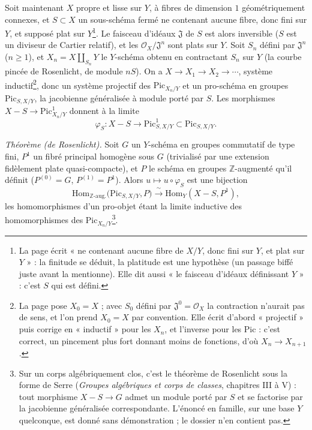 \documentclass[11pt,a4paper]{article}
\begin{document}
Soit maintenant $X$ propre et lisse sur $Y$, à fibres de dimension $1$
géométriquement connexes, et $S \subset X$ un sous-schéma fermé ne contenant
aucune fibre, donc fini sur $Y$, et supposé plat sur $Y$\footnote{La page écrit
« ne contenant aucune fibre de $X/Y$, donc fini sur $Y$, et plat sur $Y$ » : la
finitude se déduit, la platitude est une hypothèse (un passage biffé juste avant
la mentionne). Elle dit aussi « le faisceau d'idéaux définissant $Y$ » : c'est
$S$ qui est défini.}. Le faisceau d'idéaux $\mathfrak{J}$ de $S$ est alors
inversible ($S$ est un diviseur de Cartier relatif), et les
$\mathcal{O}_X/\mathfrak{J}^n$ sont plats sur $Y$. Soit $S_n$ défini par
$\mathfrak{J}^n$ ($n \geq 1$), et $X_n = X \amalg_{S_n} Y$ le $Y$-schéma obtenu en
contractant $S_n$ sur $Y$ (la courbe pincée de Rosenlicht, de module $nS$). On a
$X \to X_1 \to X_2 \to \cdots$, système inductif\footnote{La page pose $X_0 = X$ ;
avec $S_0$ défini par $\mathfrak{J}^0 = \mathcal{O}_X$ la contraction n'aurait pas
de sens, et l'on prend $X_0 = X$ par convention. Elle écrit d'abord
« projectif » puis corrige en « inductif » pour les $X_n$, et l'inverse pour les
$\mathrm{Pic}$ : c'est correct, un pincement plus fort donnant moins de fonctions,
d'où $X_n \to X_{n+1}$.}, donc un système projectif des $\mathrm{Pic}_{X_n/Y}$ et
un pro-schéma en groupes $\mathrm{Pic}_{S,X/Y}$, la jacobienne généralisée à
module porté par $S$. Les morphismes $X - S \to \mathrm{Pic}^1_{X_n/Y}$ donnent à
la limite
\[
\varphi_S : X - S \longrightarrow \mathrm{Pic}^1_{S,X/Y} \subset \mathrm{Pic}_{S,X/Y}.
\]


\emph{Théorème (de Rosenlicht).} Soit $G$ un $Y$-schéma en groupes commutatif de
type fini, $P^1$ un fibré principal homogène sous $G$ (trivialisé par une
extension fidèlement plate quasi-compacte), et $P$ le schéma en groupes
$\mathbb{Z}$-augmenté qu'il définit ($P^{(0)} = G$, $P^{(1)} = P^1$). Alors
$u \mapsto u \circ \varphi_S$ est une bijection
\[
\mathrm{Hom}_{\mathbb{Z}\text{-aug.}}\bigl(\mathrm{Pic}_{S,X/Y}, P\bigr)
\xrightarrow{\ \sim\ } \mathrm{Hom}_Y(X - S, P^1),
\]
les homomorphismes d'un pro-objet étant la limite inductive des homomorphismes
des $\mathrm{Pic}_{X_n/Y}$\footnote{Sur un corps algébriquement clos, c'est le
théorème de Rosenlicht sous la forme de Serre (\emph{Groupes algébriques et corps
de classes}, chapitres III à V) : tout morphisme $X - S \to G$ admet un module
porté par $S$ et se factorise par la jacobienne généralisée correspondante.
L'énoncé en famille, sur une base $Y$ quelconque, est donné sans démonstration ;
le dossier n'en contient pas.}.
\end{document}
